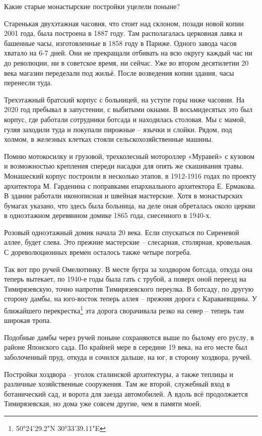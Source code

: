 Какие старые монастырские постройки уцелели поныне?

Старенькая двухэтажная часовня, что стоит над склоном, позади новой копии 2001 года, была построена в 1887 году. Там располагалась церковная лавка и башенные часы, изготовленные в 1858 году в Париже. Одного завода часов хватало на 6-7 дней. Они не прекращали отбивать на всю округу каждый час ни до революции, ни в советское время, ни сейчас. Уже во втором десятилетии 20 века магазин переделали под жильё. После возведения копии здания, часы перенесли туда.

Трехэтажный братский корпус с больницей, на уступе горы ниже часовни. На 2020 год пребывал в запустении, с выбитыми окнами. В восьмидесятых это был корпус, где работали сотрудники ботсада и находилась столовая. Мы с мамой, гуляя заходили туда и покупали пирожные – язычки и слойки. Рядом, под холмом, в железных клетках стояли сельскохозяйственные машины. 

Помню мотокосилку и грузовой, трехколесный мотороллер «Муравей» с кузовом и возможностью крепления спереди насадки для опять же скашивания травы. Монашеский корпус построили в несколько этапов, в 1912-1916 годах по проекту архитектора М. Гарденина с поправками епархиального архитектора Е. Ермакова. В здании работали иконописная и швейная мастерские. Хотя в монастырских бумагах указано, что здесь была больница, на деле оная обреталась около церкви в одноэтажном деревянном домике 1865 года, снесенного в 1940-х.

Розовый одноэтажный домик начала 20 века. Если спускаться по Сиреневой аллее, будет слева. Это прежние мастерские – слесарная, столярная, кровельная. С дореволюционных времен осталось также четыре погреба.

Так вот про ручей Омелютинку. В месте бугра за хоздвором ботсада, откуда она теперь вытекает, по 1940-е годы была гать с трубой, а поверх оной переезд на Тимирязевскую, точно напротив Тимирязевского переулка. В ботсаду, по другую сторону дамбы, на юго-восток теперь аллея – прежняя дорога с Караваевщины. У ближайшего перекрестка\footnote{50°24'29.2"N 30°33'39.11"E} эта дорога сворачивала резко на север – теперь там широкая тропа.

Подобные дамбы через ручей поныне сохраняются выше по былому его руслу, в районе Японского сада. По крайней мере в середине 19 века, на его месте был заболоченный пруд, откуда и сочился дальше, на юг, в сторону хоздвора, ручей.

Постройки хоздвора – уголок сталинской архитектуры, а также теплицы и различные хозяйственные сооружения. Там же второй, служебный вход в ботанический сад, и ворота для заезда автомобилей. А вдоль всё продолжается Тимирязевская, но дома уже совсем другие, чем в памяти моей.

